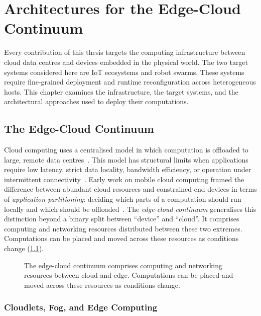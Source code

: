 \chapter{Architectures for the Edge-Cloud Continuum}
\label{chap:edge-cloud-continuum}

Every contribution of this thesis targets the computing infrastructure between cloud data centres and devices embedded in the physical world.
%
The two target systems considered here are \ac{IoT} ecosystems and robot swarms.
These systems require fine-grained deployment and runtime reconfiguration across heterogeneous hosts.
%
This chapter examines the infrastructure, the target systems, and the architectural approaches used to deploy their computations.

\section{The Edge-Cloud Continuum}
\label{sec:the-continuum}

Cloud computing uses a centralised model in which computation is offloaded to large, remote data centres~\cite{DBLP:journals/cacm/ArmbrustFGJKKLPRSZ10}.
This model has structural limits when applications require low latency,
strict data locality,
bandwidth efficiency,
or operation under intermittent connectivity~\cite{DBLP:journals/iotj/ShiCZLX16,DBLP:journals/computer/Satyanarayanan17}.
%
Early work on mobile cloud computing framed the difference between abundant cloud resources and constrained end devices in terms of \emph{application partitioning}:
deciding which parts of a computation should run locally and which should be offloaded~\cite{DBLP:journals/jnca/LiuASGBQ15}.
%
The \emph{edge-cloud continuum} generalises this distinction beyond a binary split between ``device'' and ``cloud''.
It comprises computing and networking resources distributed between these two extremes.
Computations can be placed and moved across these resources as conditions change (\cref{fig:edge-cloud-continuum}).

\begin{figure}
    \centering
    \def\svgwidth{6cm}
    
    \caption[The edge-cloud continuum]{The edge-cloud continuum comprises computing and networking resources between cloud and edge. Computations can be placed and moved across these resources as conditions change.}
    \label{fig:edge-cloud-continuum}
\end{figure}

\subsection{Cloudlets, Fog, and Edge Computing}
\label{subsec:continuum-evolution}

